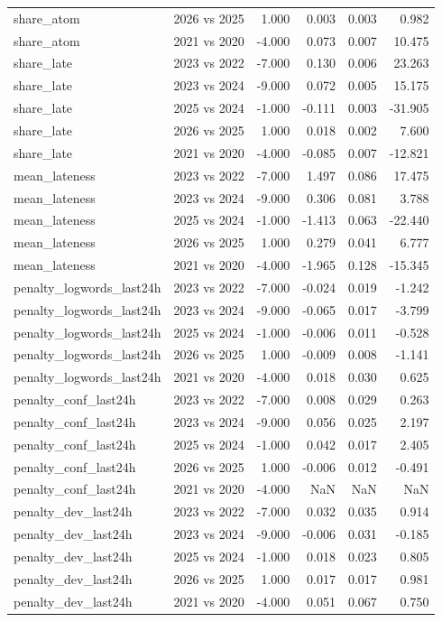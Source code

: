 \begin{table}
\begin{tabular}{llrrrr}
share\_atom & 2026 vs 2025 & 1.000 & 0.003 & 0.003 & 0.982 \\
share\_atom & 2021 vs 2020 & -4.000 & 0.073 & 0.007 & 10.475 \\
share\_late & 2023 vs 2022 & -7.000 & 0.130 & 0.006 & 23.263 \\
share\_late & 2023 vs 2024 & -9.000 & 0.072 & 0.005 & 15.175 \\
share\_late & 2025 vs 2024 & -1.000 & -0.111 & 0.003 & -31.905 \\
share\_late & 2026 vs 2025 & 1.000 & 0.018 & 0.002 & 7.600 \\
share\_late & 2021 vs 2020 & -4.000 & -0.085 & 0.007 & -12.821 \\
mean\_lateness & 2023 vs 2022 & -7.000 & 1.497 & 0.086 & 17.475 \\
mean\_lateness & 2023 vs 2024 & -9.000 & 0.306 & 0.081 & 3.788 \\
mean\_lateness & 2025 vs 2024 & -1.000 & -1.413 & 0.063 & -22.440 \\
mean\_lateness & 2026 vs 2025 & 1.000 & 0.279 & 0.041 & 6.777 \\
mean\_lateness & 2021 vs 2020 & -4.000 & -1.965 & 0.128 & -15.345 \\
penalty\_logwords\_last24h & 2023 vs 2022 & -7.000 & -0.024 & 0.019 & -1.242 \\
penalty\_logwords\_last24h & 2023 vs 2024 & -9.000 & -0.065 & 0.017 & -3.799 \\
penalty\_logwords\_last24h & 2025 vs 2024 & -1.000 & -0.006 & 0.011 & -0.528 \\
penalty\_logwords\_last24h & 2026 vs 2025 & 1.000 & -0.009 & 0.008 & -1.141 \\
penalty\_logwords\_last24h & 2021 vs 2020 & -4.000 & 0.018 & 0.030 & 0.625 \\
penalty\_conf\_last24h & 2023 vs 2022 & -7.000 & 0.008 & 0.029 & 0.263 \\
penalty\_conf\_last24h & 2023 vs 2024 & -9.000 & 0.056 & 0.025 & 2.197 \\
penalty\_conf\_last24h & 2025 vs 2024 & -1.000 & 0.042 & 0.017 & 2.405 \\
penalty\_conf\_last24h & 2026 vs 2025 & 1.000 & -0.006 & 0.012 & -0.491 \\
penalty\_conf\_last24h & 2021 vs 2020 & -4.000 & NaN & NaN & NaN \\
penalty\_dev\_last24h & 2023 vs 2022 & -7.000 & 0.032 & 0.035 & 0.914 \\
penalty\_dev\_last24h & 2023 vs 2024 & -9.000 & -0.006 & 0.031 & -0.185 \\
penalty\_dev\_last24h & 2025 vs 2024 & -1.000 & 0.018 & 0.023 & 0.805 \\
penalty\_dev\_last24h & 2026 vs 2025 & 1.000 & 0.017 & 0.017 & 0.981 \\
penalty\_dev\_last24h & 2021 vs 2020 & -4.000 & 0.051 & 0.067 & 0.750 \\
\bottomrule
\end{tabular}
\end{table}
